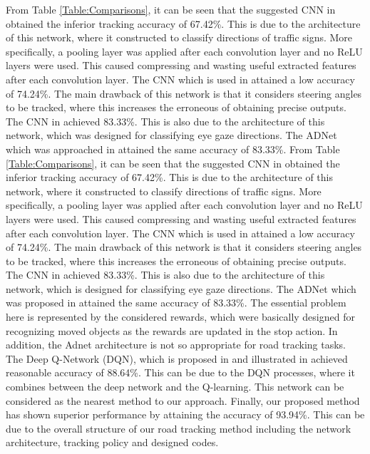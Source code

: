 \documentclass{svproc}
\begin{document}
From Table \ref{Table:Comparisons}, it can be seen that the suggested CNN in \cite{Karaduman2017Deep} obtained the inferior tracking accuracy of 67.42\%. This is due to the architecture of this network, where it constructed to classify directions of traffic signs. More specifically, a pooling layer was applied after each convolution layer and no ReLU layers were used. This caused compressing and wasting useful extracted features after each convolution layer. The CNN which is used in \cite{bojarski2016end} attained a low accuracy of 74.24\%. The main drawback of this network is that it considers steering angles to be tracked, where this increases the erroneous of obtaining precise outputs. The CNN in \cite{George2016Real} achieved 83.33\%. This is also due to the architecture of this network, which was designed for classifying eye gaze directions. The ADNet which was approached in \cite{Yun2017Action,Yun2018Action} attained the same accuracy of 83.33\%. 
From Table \ref{Table:Comparisons}, it can be seen that the suggested CNN in \cite{Karaduman2017Deep} obtained the inferior tracking accuracy of 67.42\%. This is due to the architecture of this network, where it constructed to classify directions of traffic signs. More specifically, a pooling layer was applied after each convolution layer and no ReLU layers were used. This caused compressing and wasting useful extracted features after each convolution layer. The CNN which is used in \cite{bojarski2016end} attained a low accuracy of 74.24\%. The main drawback of this network is that it considers steering angles to be tracked, where this increases the erroneous of obtaining precise outputs. The CNN in \cite{George2016Real} achieved 83.33\%. This is also due to the architecture of this network, which is designed for classifying eye gaze directions. The ADNet which was proposed in \cite{Yun2017Action,Yun2018Action} attained the same accuracy of 83.33\%. 
The essential problem here is represented by the considered rewards, which were basically designed %
for recognizing moved objects as the rewards are updated in the stop action. In addition, the Adnet architecture is not so appropriate for road tracking tasks. The Deep Q-Network (DQN), which is proposed in \cite{mnih2015human} and illustrated in \cite{arulkumaran2017brief} achieved reasonable accuracy of 88.64\%. This can be due to the DQN processes, where it combines between the deep network and the Q-learning. This network can be considered as the nearest method to our approach. Finally, our proposed method has shown superior performance by attaining the accuracy of 93.94\%. This can be due to the overall structure of our road tracking method including the network architecture, tracking policy and designed codes.
\end{document}
